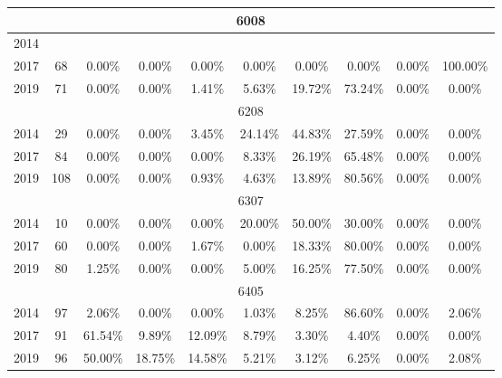\begin{table}[H]
\begin{tabular}{|l|c|ccc|ccc|cc|}
\hline
\hline
\multicolumn{10}{|c|}{6008}\\
\hline
2014 & & & & & & & & & \\
2017 & 68 & 0.00\% & 0.00\% & 0.00\% & 0.00\% & 0.00\% & 0.00\% & 0.00\% & 100.00\%\\
2019 & 71 & 0.00\% & 0.00\% & 1.41\% & 5.63\% & 19.72\% & 73.24\% & 0.00\% & 0.00\%\\
\hline
\hline
\multicolumn{10}{|c|}{6208}\\
\hline
2014 & 29 & 0.00\% & 0.00\% & 3.45\% & 24.14\% & 44.83\% & 27.59\% & 0.00\% & 0.00\%\\
2017 & 84 & 0.00\% & 0.00\% & 0.00\% & 8.33\% & 26.19\% & 65.48\% & 0.00\% & 0.00\%\\
2019 & 108 & 0.00\% & 0.00\% & 0.93\% & 4.63\% & 13.89\% & 80.56\% & 0.00\% & 0.00\%\\
\hline
\hline
\multicolumn{10}{|c|}{6307}\\
\hline
2014 & 10 & 0.00\% & 0.00\% & 0.00\% & 20.00\% & 50.00\% & 30.00\% & 0.00\% & 0.00\%\\
2017 & 60 & 0.00\% & 0.00\% & 1.67\% & 0.00\% & 18.33\% & 80.00\% & 0.00\% & 0.00\%\\
2019 & 80 & 1.25\% & 0.00\% & 0.00\% & 5.00\% & 16.25\% & 77.50\% & 0.00\% & 0.00\%\\
\hline
\hline
\multicolumn{10}{|c|}{6405}\\
\hline
2014 & 97 & 2.06\% & 0.00\% & 0.00\% & 1.03\% & 8.25\% & 86.60\% & 0.00\% & 2.06\%\\
2017 & 91 & 61.54\% & 9.89\% & 12.09\% & 8.79\% & 3.30\% & 4.40\% & 0.00\% & 0.00\%\\
2019 & 96 & 50.00\% & 18.75\% & 14.58\% & 5.21\% & 3.12\% & 6.25\% & 0.00\% & 2.08\%\\
\hline
\bottomrule
\end{tabular}
\end{table}
